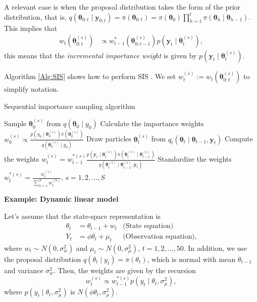 A relevant case is when the proposal distribution takes the form of the prior distribution, that is, $q(\bm{\theta}_{0:t}\mid \bm{y}_{0:t}) = \pi(\bm{\theta}_{0:t}) = \pi(\bm{\theta}_0)\prod_{h=1}^{t}\pi(\bm{\theta}_h\mid \bm{\theta}_{h-1})$. This implies that
\begin{align*}
	w_{t}(\bm{\theta}^{(s)}_{0:t})&\propto w_{t-1}^*(\bm{\theta}^{(s)}_{0:t-1})p(\bm{y}_{t}\mid \bm{\theta}_{t}^{(s)}),
\end{align*}
this means that the \textit{incremental importance weight} is given by $p(\bm{y}_{t}\mid \bm{\theta}_{t}^{(s)})$. 

Algorithm \ref{Alg:SIS} shows how to perform SIS \cite{cappe2007overview}. We set $w_t^{(s)}:=w_t(\bm{\theta}_{0:t}^{(s)})$ to simplify notation.\\
\begin{algorithm}[h!]
	\caption{Sequential importance sampling algorithm}\label{Alg:SIS}
	\begin{algorithmic}[1]
		\State Sample $\bm{\theta}_0^{(s)}$ from $q(\bm{\theta}_0\mid y_0)$
		\State Calculate the importance weights $w_0^{(s)}\propto\frac{p(y_0\mid \bm{\theta}_0^{(s)})\pi(\bm{\theta}_0^{(s)})}{q(\bm{\theta}_0^{(s)}\mid y_0)}$ 
		\EndFor 
				\State Draw particles $\bm{\theta}_t^{(s)}$ from $q_t(\bm{\theta}_t\mid \bm{\theta}_{t-1}, \bm{y}_t)$
				\State Compute the weights $w_t^{(s)}=w_{t-1}^{*(s)}\frac{p(\bm{y}_{t}\mid \bm{\theta}_{t}^{(s)})\pi(\bm{\theta}_{t}^{(s)}\mid \bm{\theta}_{t-1}^{(s)})}{q(\bm{\theta}_t^{(s)}\mid \bm{\theta}_{t-1}^{(s)},\bm{y}_{t})}$
			\EndFor
			\State Standardize the weights $w_t^{*(s)}=\frac{w_t^{(s)}}{\sum_{h=1}^Sw_t^{(h)}}$, $s=1,2,\dots,S$  
		\EndFor
	\end{algorithmic} 
\end{algorithm}

\textbf{Example: Dynamic linear model}

Let's assume that the state-space representation is  
\begin{align*}
	{\theta}_t &= {\theta}_{t-1} + {w}_t & \text{(State equation)} \nonumber\\
	Y_t & = \phi {\theta}_t + \mu_t & \text{(Observation equation)},
\end{align*}
where ${w}_t\sim N(0, \sigma_w^2)$ and $\mu_t\sim N(0,\sigma_{\mu}^2)$, $t=1,2,\dots,50$. In addition, we use the proposal distribution $q(\theta_t\mid y_t)=\pi(\theta_t)$, which is normal with mean $\theta_{t-1}$ and variance $\sigma_w^2$. Then, the weights are given by the recursion  
\[ 
w_t^{(s)} \propto w_{t-1}^{*(s)} p(y_t\mid \theta_t,\sigma_{\mu}^2), 
\]  
where $p(y_t\mid \theta_t,\sigma_{\mu}^2)$ is $N(\phi \theta_t, \sigma_{\mu}^2)$.  

